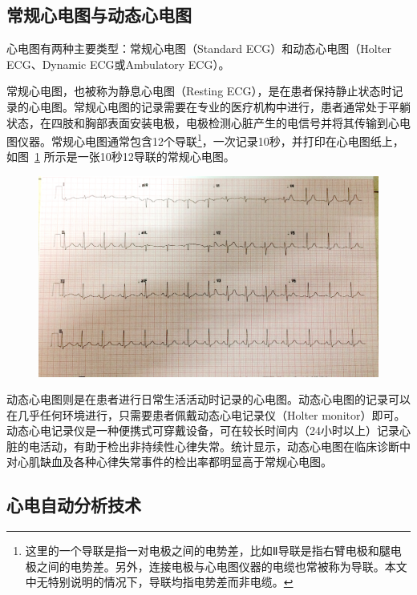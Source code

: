 \subsection{常规心电图与动态心电图}\label{subsec:standard-holter}

心电图有两种主要类型：常规心电图（Standard ECG）和动态心电图（Holter ECG、Dynamic ECG或Ambulatory ECG）。

常规心电图，也被称为静息心电图（Resting ECG），是在患者保持静止状态时记录的心电图。常规心电图的记录需要在专业的医疗机构中进行，患者通常处于平躺状态，在四肢和胸部表面安装电极，电极检测心脏产生的电信号并将其传输到心电图仪器。常规心电图通常包含12个导联\footnote{这里的一个导联是指一对电极之间的电势差，比如Ⅱ导联是指右臂电极和腿电极之间的电势差。另外，连接电极与心电图仪器的电缆也常被称为导联。本文中无特别说明的情况下，导联均指电势差而非电缆。}，一次记录10秒，并打印在心电图纸上，如图~\ref{fig:10sec-ekg-lead} 所示是一张10秒12导联的常规心电图。

\begin{figure}[ht]
    \includegraphics[width=\textwidth]{../assets/10sec-ekg-lead}
    \label{fig:10sec-ekg-lead}
\end{figure}

动态心电图则是在患者进行日常生活活动时记录的心电图。动态心电图的记录可以在几乎任何环境进行，只需要患者佩戴动态心电记录仪（Holter monitor）即可。动态心电记录仪是一种便携式可穿戴设备，可在较长时间内（24小时以上）记录心脏的电活动，有助于检出非持续性心律失常。统计显示，动态心电图在临床诊断中对心肌缺血及各种心律失常事件的检出率都明显高于常规心电图\cite{zhengDongtaixindiantuyuchangguixindiantuzhenduanguanxinbinghuanzhexinjiquexiejixinlushichangdelinchuangxiaoguobijiao2011}。

\subsection{心电自动分析技术}\label{subsec:automatic-analysis}

